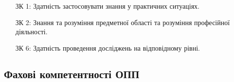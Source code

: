 \documentclass{Syllabus}
\begin{document}
\begin{enumerate}
	\item [ЗК 1:] Здатність застосовувати знання у практичних ситуаціях.
	\item [ЗК 2:] Знання та розуміння предметної області та розуміння професійної діяльності.
	\item [ЗК 6:] Здатність проведення досліджень на відповідному рівні.
\end{enumerate}

\subsection*{Фахові компетентності ОПП}
\end{document}
